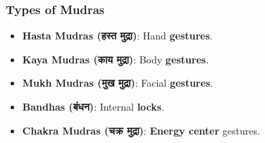 \begin{frame}[fragile]\frametitle{Types of Mudras}

      \begin{itemize}
        \item \textbf{Hasta Mudras (हस्त मुद्रा)}: Hand \textbf{gestures}.
        \item \textbf{Kaya Mudras (काय मुद्रा)}: Body \textbf{gestures}.
        \item \textbf{Mukh Mudras (मुख मुद्रा)}: Facial \textbf{gestures}.
        \item \textbf{Bandhas (बंधन)}: Internal \textbf{locks}.
        \item \textbf{Chakra Mudras (चक्र मुद्रा)}: \textbf{Energy center} gestures.
      \end{itemize}

\end{frame}


